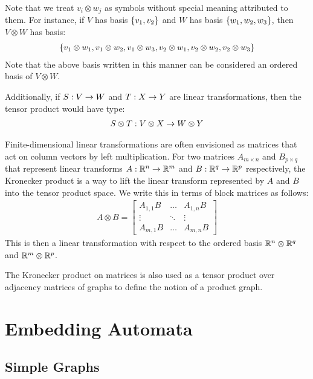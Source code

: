 \documentclass[12pt]{article}
\begin{document}
Note that we treat \(v_i \otimes w_j\)
as symbols without special meaning attributed to them.
For instance, if \(V\) has basis \(\left\{v_1, v_2\right\}\)
and \(W\) has basis \(\left\{w_1, w_2, w_3\right\}\),
then \(V \otimes W\) has basis:
\begin{align*}
  \left\{v_1 \otimes w_1, v_1 \otimes w_2, v_1 \otimes w_3,
          v_2 \otimes w_1, v_2 \otimes w_2, v_2 \otimes w_3\right\}
\end{align*}
Note that the above basis written in this manner can be considered
an ordered basis of \(V \otimes W\).

Additionally, if \(S : V \to W\) and \(T : X \to Y\)
are linear transformations,
then the tensor product would have type:
\begin{align*}
  S \otimes T : V \otimes X \to W \otimes Y
\end{align*}

Finite-dimensional linear transformations are often envisioned
as matrices that act on column vectors by left multiplication.
For two matrices \(A_{m \times n}\) and \(B_{p \times q}\)
that represent linear transforms
\(A : \mathbb{R}^n \to \mathbb{R}^m\) and \(B : \mathbb{R}^q \to \mathbb{R}^p\) respectively,
the Kronecker product is a way to lift the linear
transform represented by \(A\) and \(B\) into the tensor product space.
We write this in terms of block matrices as follows:
\begin{align*}
  {A \otimes B}
    = \begin{bmatrix}
        A_{1, 1} B & \ldots & A_{1, n} B \\
        \vdots & \ddots & \vdots \\
        A_{m, 1} B & \ldots & A_{m, n} B
      \end{bmatrix}
\end{align*}
This is then a linear transformation with respect to the ordered basis
\(\mathbb{R}^n \otimes \mathbb{R}^q\) and \(\mathbb{R}^m \otimes \mathbb{R}^p\).

The Kronecker product on matrices is also used as a tensor product over
adjacency matrices of graphs to define the notion of a product graph.



\section{Embedding Automata}


\subsection{Simple Graphs}
\end{document}
